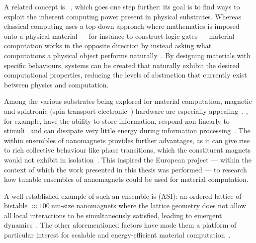 A related concept is ~\cite{NeglectedPillar}, which goes one step further: its goal is to find ways to exploit the inherent computing power present in physical substrates.
Whereas classical computing uses a top-down approach where mathematics is imposed onto a physical material --- for instance to construct logic gates --- material computation works in the opposite direction by instead asking what computations a physical object performs naturally~\cite{RC_ASI}.
By designing materials with specific behaviours, systems can be created that naturally exhibit the desired computational properties, reducing the levels of abstraction that currently exist between physics and computation. \par
Among the various substrates being explored for material computation, magnetic and spintronic (spin transport electronic~\cite{Spintronics}) hardware are especially appealing~\cite{grollier2020neuromorphic,NeuromorphicSpintronicsProspect,QuantumNeuromorphicOpportunities}.
  , for example, have the ability to store information, respond non-linearly to stimuli~\cite{NeuromorphicSpintronics} and can dissipate very little energy during information processing~\cite{ThermodynamicLimitsComputation,SpintronicsEnergyEfficientComputing}.
The  within ensembles of nanomagnets provides further advantages, as it can give rise to rich collective behaviour like phase transitions, which the constituent magnets would not exhibit in isolation~\cite{NeuromorphicSpintronicsProspect,RC_ASI}.
This inspired the European \spinengine project --- within the context of which the work presented in this thesis was performed --- to research how tunable ensembles of nanomagnets could be used for material computation. \par %
A well-established example of such an ensemble is  (ASI): an ordered lattice of bistable $\approx \SI{100}{\nano\metre}$-size nanomagnets where the lattice geometry does not allow all local interactions to be simultaneously satisfied, leading to emergent dynamics~\cite{ASIpyrochlores}.
The other aforementioned factors have made them a platform of particular interest for scalable and energy-efficient material computation~\cite{PhD_Stromberg}.
